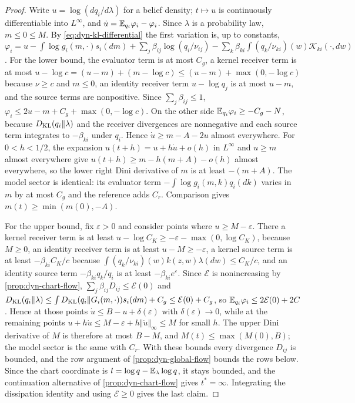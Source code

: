 \begin{proof}
Write $u=\log(dq_i/d\lambda)$ for a belief density; $t\mapsto u$ is continuously differentiable into $L^\infty$, and $\dot u=\mathbb E_{q_i}\varphi_i-\varphi_i$. Since $\lambda$ is a probability law, $m\leq0\leq M$. By \cref{eq:dyn-kl-differential} the first variation is, up to constants, $\varphi_i=u-\int\log g_i(m,\cdot)s_i(dm)+\sum_j\beta_{ij}\log(q_i/\nu_{ij})-\sum_k\beta_{ki}\int(q_k/\nu_{ki})(w)\mathcal K_{ki}(\cdot,dw)$. For the lower bound, the evaluator term is at most $C_g$, a kernel receiver term is at most $u-\log c=(u-m)+(m-\log c)\leq(u-m)+\max(0,-\log c)$ because $\nu\geq c$ and $m\leq0$, an identity receiver term $u-\log q_j$ is at most $u-m$, and the source terms are nonpositive. Since $\sum_j\beta_{ij}\leq1$, $\varphi_i\leq2u-m+C_g+\max(0,-\log c)$. On the other side $\mathbb E_{q_i}\varphi_i\geq-C_g-N$, because $D_{\mathrm{KL}}(q_i\Vert\lambda)$ and the receiver divergences are nonnegative and each source term integrates to $-\beta_{ki}$ under $q_i$. Hence $\dot u\geq m-A-2u$ almost everywhere. For $0<h<1/2$, the expansion $u(t+h)=u+h\dot u+o(h)$ in $L^\infty$ and $u\geq m$ almost everywhere give $u(t+h)\geq m-h(m+A)-o(h)$ almost everywhere, so the lower right Dini derivative of $m$ is at least $-(m+A)$. The model sector is identical: its evaluator term $-\int\log g_i(m,k)q_i(dk)$ varies in $m$ by at most $C_g$ and the reference adds $C_r$. Comparison gives $m(t)\geq\min(m(0),-A)$.

For the upper bound, fix $\varepsilon>0$ and consider points where $u\geq M-\varepsilon$. There a kernel receiver term is at least $u-\log C_K\geq-\varepsilon-\max(0,\log C_K)$, because $M\geq0$, an identity receiver term is at least $u-M\geq-\varepsilon$, a kernel source term is at least $-\beta_{ki}C_K/c$ because $\int(q_k/\nu_{ki})(w)k(z,w)\lambda(dw)\leq C_K/c$, and an identity source term $-\beta_{ki}q_k/q_i$ is at least $-\beta_{ki}e^{\varepsilon}$. Since $\mathcal E$ is nonincreasing by \cref{prop:dyn-chart-flow}, $\sum_j\beta_{ij}D_{ij}\leq\mathcal E(0)$ and $D_{\mathrm{KL}}(q_i\Vert\lambda)\leq\int D_{\mathrm{KL}}(q_i\Vert G_i(m,\cdot))s_i(dm)+C_g\leq\mathcal E(0)+C_g$, so $\mathbb E_{q_i}\varphi_i\leq2\mathcal E(0)+2C$. Hence at those points $\dot u\leq B-u+\delta(\varepsilon)$ with $\delta(\varepsilon)\to0$, while at the remaining points $u+h\dot u\leq M-\varepsilon+h\Vert\dot u\Vert_\infty\leq M$ for small $h$. The upper Dini derivative of $M$ is therefore at most $B-M$, and $M(t)\leq\max(M(0),B)$; the model sector is the same with $C_r$. With these bounds every divergence $D_{ij}$ is bounded, and the row argument of \cref{prop:dyn-global-flow} bounds the rows below. Since the chart coordinate is $l=\log q-\mathbb E_\lambda\log q$, it stays bounded, and the continuation alternative of \cref{prop:dyn-chart-flow} gives $t^*=\infty$. Integrating the dissipation identity and using $\mathcal E\geq0$ gives the last claim.
\end{proof}

